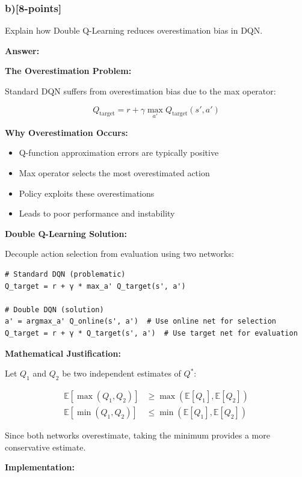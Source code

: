 \documentclass[12pt]{article}
\begin{document}
{{\subsubsection{b)[8-points]} Explain how Double Q-Learning reduces overestimation bias in DQN.

\textbf{Answer:}

\textbf{The Overestimation Problem:}

Standard DQN suffers from overestimation bias due to the max operator:

\begin{equation}
Q_{\text{target}} = r + \gamma \max_{a'} Q_{\text{target}}(s', a')
\end{equation}

\textbf{Why Overestimation Occurs:}
\begin{itemize}
\item Q-function approximation errors are typically positive
\item Max operator selects the most overestimated action
\item Policy exploits these overestimations
\item Leads to poor performance and instability
\end{itemize}

\textbf{Double Q-Learning Solution:}

Decouple action selection from evaluation using two networks:

\begin{verbatim}
# Standard DQN (problematic)
Q_target = r + γ * max_a' Q_target(s', a')

# Double DQN (solution)
a' = argmax_a' Q_online(s', a')  # Use online net for selection
Q_target = r + γ * Q_target(s', a')  # Use target net for evaluation
\end{verbatim}

\textbf{Mathematical Justification:}

Let $Q_1$ and $Q_2$ be two independent estimates of $Q^*$:

\begin{align}
\mathbb{E}[\max(Q_1, Q_2)] &\geq \max(\mathbb{E}[Q_1], \mathbb{E}[Q_2]) \\
\mathbb{E}[\min(Q_1, Q_2)] &\leq \min(\mathbb{E}[Q_1], \mathbb{E}[Q_2])
\end{align}

Since both networks overestimate, taking the minimum provides a more conservative estimate.

\textbf{Implementation:}

}}
\end{document}
